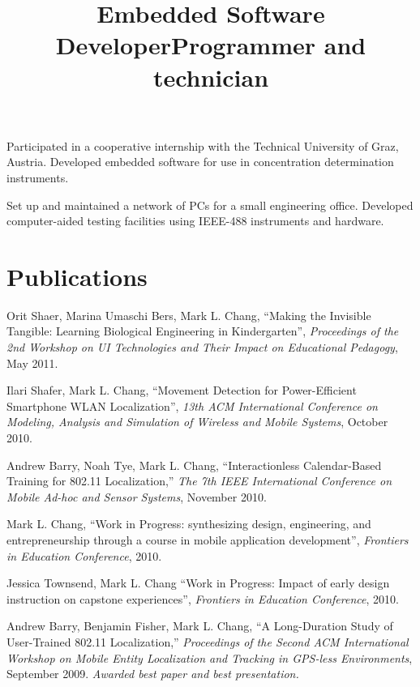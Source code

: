 \documentclass[line]{res}
\begin{document}
\begin{resume}
	\title{Embedded Software Developer} 
	  
	\begin{position}
		Participated in a cooperative internship with the Technical University of Graz, Austria. Developed embedded software for use in concentration determination instruments. 
	\end{position}
	
	\title{Programmer and technician} 
	  
	\begin{position}
		Set up and maintained a network of PCs for a small engineering office. Developed computer-aided testing facilities using IEEE-488 instruments and hardware. 
	\end{position}
	
	\section{\sc Publications}
	
	Orit Shaer, Marina Umaschi Bers, Mark L. Chang, ``Making the Invisible Tangible: Learning Biological Engineering in Kindergarten'', \textit{Proceedings of the 2nd Workshop on UI Technologies and Their Impact on Educational Pedagogy}, May 2011.
	
	Ilari Shafer, Mark L. Chang, ``Movement Detection for Power-Efficient Smartphone WLAN Localization'', \textit{13th ACM International Conference on Modeling, Analysis and Simulation of Wireless and Mobile Systems}, October 2010.
	
	Andrew Barry, Noah Tye, Mark L. Chang, ``Interactionless Calendar-Based Training for 802.11 Localization,'' \textit{The 7th IEEE International Conference on Mobile Ad-hoc and Sensor Systems}, November 2010.
	
	Mark L. Chang, ``Work in Progress: synthesizing design, engineering, and entrepreneurship through a course in mobile application development'', \textit{Frontiers in Education Conference}, 2010.
	
	Jessica Townsend, Mark L. Chang ``Work in Progress: Impact of early design instruction on capstone experiences'', \textit{Frontiers in Education Conference}, 2010.
	
	Andrew Barry, Benjamin Fisher, Mark L. Chang, ``A Long-Duration Study of User-Trained 802.11 Localization,'' \emph{Proceedings of the Second ACM International Workshop on Mobile Entity Localization and Tracking in GPS-less Environments}, September 2009. \textit{Awarded best paper and best presentation.}
	

\end{resume}
\end{document}
